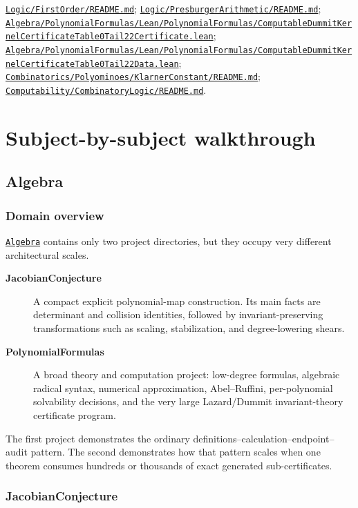 \documentclass[
  10pt,
  a4paper,
  twoside,
  open=any,
  parskip=half,
  headings=big
]{scrreprt}
\newcommand{\CommitFull}{675d0a2ff0fc624fba199e006049016ba806f40a}
\newcommand{\RepoBlobBase}{https://github.com/VladimirReshetnikov/ProveIt/blob/\CommitFull/}
\newcommand{\RepoTreeBase}{https://github.com/VladimirReshetnikov/ProveIt/tree/\CommitFull/}
\newcommand{\RepoFile}[1]{%
  \href{\RepoBlobBase\detokenize{#1}}{\nolinkurl{#1}}}
\newcommand{\RepoDir}[1]{%
  \href{\RepoTreeBase\detokenize{#1}}{\nolinkurl{#1}}}
\newcommand{\project}[1]{\textsf{\bfseries #1}}
\begin{document}
\begin{sourcebox}
\RepoFile{Logic/FirstOrder/README.md};
\RepoFile{Logic/PresburgerArithmetic/README.md};
\RepoFile{Algebra/PolynomialFormulas/Lean/PolynomialFormulas/ComputableDummitKernelCertificateTable0Tail22Certificate.lean};
\RepoFile{Algebra/PolynomialFormulas/Lean/PolynomialFormulas/ComputableDummitKernelCertificateTable0Tail22Data.lean};
\RepoFile{Combinatorics/Polyominoes/KlarnerConstant/README.md};
\RepoFile{Computability/CombinatoryLogic/README.md}.
\end{sourcebox}

\part{Subject-by-subject walkthrough}

\chapter{Algebra}
\label{chap:algebra}

\section{Domain overview}

\RepoDir{Algebra} contains only two project directories, but they occupy very
different architectural scales.

\begin{description}
  \item[\project{JacobianConjecture}] A compact explicit polynomial-map
        construction.  Its main facts are determinant and collision
        identities, followed by invariant-preserving transformations such as
        scaling, stabilization, and degree-lowering shears.
  \item[\project{PolynomialFormulas}] A broad theory and computation project:
        low-degree formulas, algebraic radical syntax, numerical
        approximation, Abel--Ruffini, per-polynomial solvability decisions,
        and the very large Lazard/Dummit invariant-theory certificate program.
\end{description}

The first project demonstrates the ordinary
definitions--calculation--endpoint--audit pattern.  The second demonstrates
how that pattern scales when one theorem consumes hundreds or thousands of
exact generated sub-certificates.

\section{JacobianConjecture}
\label{sec:jacobian}
\end{document}
